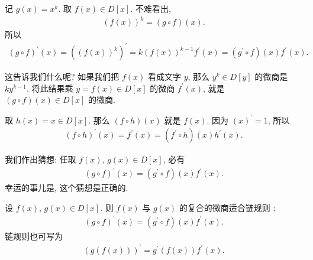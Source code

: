 记 $g(x) = x^k$. 取 $f(x) \in D[x]$. 不难看出,
\begin{align*}
    (f(x))^k = (g \circ f)(x).
\end{align*}
所以
\begin{align*}
    (g \circ f)^{\prime}(x) = ((f(x))^k)^{\prime} = k(f(x))^{k-1} f^{\prime} (x) = (g^{\prime} \circ f)(x) f^{\prime} (x).
\end{align*}

这告诉我们什么呢? 如果我们把 $f(x)$ 看成文字 $y$, 那么 $y^k \in D[y]$ 的微商是 $ky^{k-1}$. 将此结果乘 $y = f(x) \in D[x]$ 的微商 $f^{\prime} (x)$, 就是 $(g \circ f) (x) \in D[x]$ 的微商.

取 $h(x) = x \in D[x]$. 那么 $(f \circ h)(x)$ 就是 $f(x)$. 因为 $(x)^{\prime} = 1$, 所以
\begin{align*}
    (f \circ h)^{\prime} (x) = f^{\prime} (x) = (f^{\prime} \circ h) (x) h^{\prime} (x).
\end{align*}

我们作出猜想: 任取 $f(x)$, $g(x) \in D[x]$, 必有
\begin{align*}
    (g \circ f)^{\prime} (x) = (g^{\prime} \circ f)(x) f^{\prime} (x).
\end{align*}
幸运的事儿是, 这个猜想是正确的.

\begin{proposition}
    设 $f(x)$, $g(x) \in D[x]$. 则 $f(x)$ 与 $g(x)$ 的复合的微商适合链规则 :
    \begin{align*}
        (g \circ f)^{\prime} (x) = (g^{\prime} \circ f)(x) f^{\prime} (x).
    \end{align*}
    链规则也可写为
    \begin{align*}
        (g(f(x)))^{\prime} = g^{\prime} (f(x)) f^{\prime} (x).
    \end{align*}
\end{proposition}

